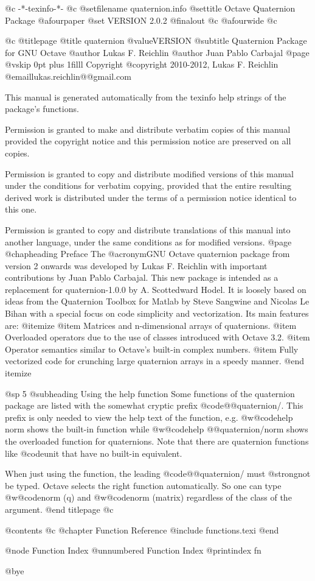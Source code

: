    @c -*-texinfo-*-
@c %
@setfilename quaternion.info
@settitle Octave Quaternion Package
@afourpaper
@set VERSION 2.0.2
@finalout
@c @afourwide
@c %

@c %
@titlepage
@title quaternion @value{VERSION}
@subtitle Quaternion Package for GNU Octave
@author Lukas F. Reichlin
@author Juan Pablo Carbajal
@page
@vskip 0pt plus 1filll
Copyright @copyright{} 2010-2012, Lukas F. Reichlin @email{lukas.reichlin@@gmail.com}

This manual is generated automatically from the texinfo help strings
of the package's functions.

Permission is granted to make and distribute verbatim copies of
this manual provided the copyright notice and this permission notice
are preserved on all copies.

Permission is granted to copy and distribute modified versions of this
manual under the conditions for verbatim copying, provided that the entire
resulting derived work is distributed under the terms of a permission
notice identical to this one.

Permission is granted to copy and distribute translations of this manual
into another language, under the same conditions as for modified versions.
@page
@chapheading Preface
The @acronym{GNU} Octave quaternion package from version 2 onwards
was developed by Lukas F. Reichlin with important contributions by
Juan Pablo Carbajal.  This new package is intended as a replacement
for quaternion-1.0.0 by A. Scottedward Hodel.  It is loosely based
on ideas from the Quaternion Toolbox for Matlab by Steve Sangwine
and Nicolas Le Bihan with a special focus on code simplicity and
vectorization.  Its main features are:
@itemize
@item Matrices and n-dimensional arrays of quaternions.
@item Overloaded operators due to the use of classes introduced with Octave 3.2.
@item Operator semantics similar to Octave's built-in complex numbers.
@item Fully vectorized code for crunching large quaternion arrays in a speedy manner.
@end itemize


@sp 5
@subheading Using the help function
Some functions of the quaternion package are listed with the somewhat cryptic prefix
@code{@@quaternion/}.  This prefix is only needed to view the help text of the function,
e.g. @w{@code{help norm}} shows the built-in function while @w{@code{help @@quaternion/norm}}
shows the overloaded function for quaternions.  Note that there are quaternion functions
like @code{unit} that have no built-in equivalent.

When just using the function, the leading @code{@@quaternion/} must @strong{not} be typed.
Octave selects the right function automatically.  So one can type @w{@code{norm (q)}}
and @w{@code{norm (matrix)}} regardless of the class of the argument.
@end titlepage
@c %

@contents
@c @chapter Function Reference
@include functions.texi
@end

@node Function Index
@unnumbered Function Index
@printindex fn

@bye
